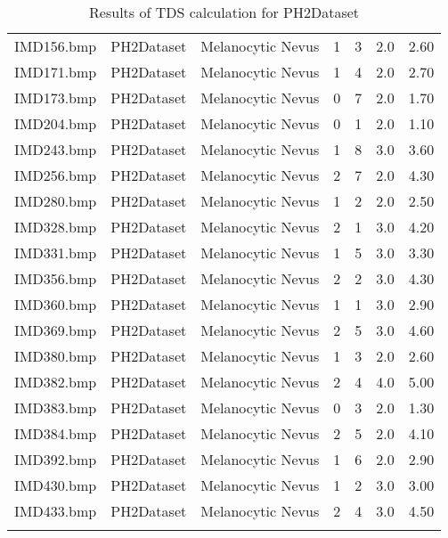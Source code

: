 \begin{longtable}{ | l | l | l | l | l | l | l |}
IMD156.bmp & PH2Dataset & Melanocytic Nevus & 1 & 3 & 2.0 & 2.60 \\
IMD171.bmp & PH2Dataset & Melanocytic Nevus & 1 & 4 & 2.0 & 2.70 \\
IMD173.bmp & PH2Dataset & Melanocytic Nevus & 0 & 7 & 2.0 & 1.70 \\
IMD204.bmp & PH2Dataset & Melanocytic Nevus & 0 & 1 & 2.0 & 1.10 \\
IMD243.bmp & PH2Dataset & Melanocytic Nevus & 1 & 8 & 3.0 & 3.60 \\
IMD256.bmp & PH2Dataset & Melanocytic Nevus & 2 & 7 & 2.0 & 4.30 \\
IMD280.bmp & PH2Dataset & Melanocytic Nevus & 1 & 2 & 2.0 & 2.50 \\
IMD328.bmp & PH2Dataset & Melanocytic Nevus & 2 & 1 & 3.0 & 4.20 \\
IMD331.bmp & PH2Dataset & Melanocytic Nevus & 1 & 5 & 3.0 & 3.30 \\
IMD356.bmp & PH2Dataset & Melanocytic Nevus & 2 & 2 & 3.0 & 4.30 \\
IMD360.bmp & PH2Dataset & Melanocytic Nevus & 1 & 1 & 3.0 & 2.90 \\
IMD369.bmp & PH2Dataset & Melanocytic Nevus & 2 & 5 & 3.0 & 4.60 \\
IMD380.bmp & PH2Dataset & Melanocytic Nevus & 1 & 3 & 2.0 & 2.60 \\
IMD382.bmp & PH2Dataset & Melanocytic Nevus & 2 & 4 & 4.0 & 5.00 \\
IMD383.bmp & PH2Dataset & Melanocytic Nevus & 0 & 3 & 2.0 & 1.30 \\
IMD384.bmp & PH2Dataset & Melanocytic Nevus & 2 & 5 & 2.0 & 4.10 \\
IMD392.bmp & PH2Dataset & Melanocytic Nevus & 1 & 6 & 2.0 & 2.90 \\
IMD430.bmp & PH2Dataset & Melanocytic Nevus & 1 & 2 & 3.0 & 3.00 \\
IMD433.bmp & PH2Dataset & Melanocytic Nevus & 2 & 4 & 3.0 & 4.50 \\
\hline

\caption{Results of TDS calculation for PH2Dataset}
\label{fig:tds_results_ph2}
\end{longtable}